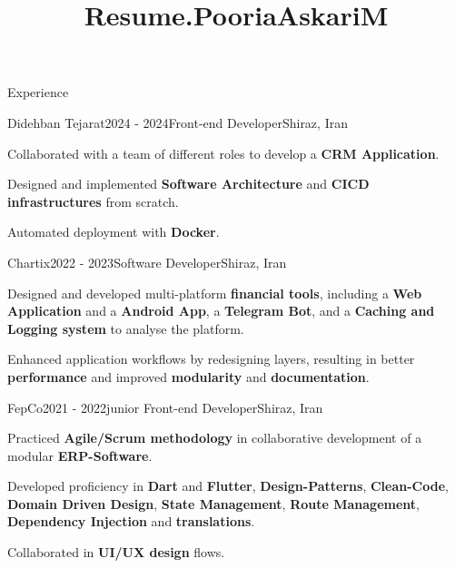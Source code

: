 \documentclass[
	a4paper, %
	11pt, %
]{resume} %
\title{Resume.PooriaAskariM}
\begin{document}
\raggedright
\setlength{\headheight}{32.33284pt}




\begin{rSection}{Experience}


	\begin{rSubsection}{Didehban Tejarat}{2024 - 2024}{Front-end Developer}{Shiraz, Iran}
		\item Collaborated with a team of different roles to develop a \textbf{CRM Application}.
		\item Designed and implemented \textbf{Software Architecture} and \textbf{CICD infrastructures} from scratch.
        \item Automated deployment with \textbf{Docker}.
        \\      
	\end{rSubsection}

	\begin{rSubsection}{Chartix}{2022 - 2023}{Software Developer}{Shiraz, Iran}
        \item Designed and developed multi-platform \textbf{financial tools}, including a \textbf{Web Application} and a \textbf{Android App}, a \textbf{Telegram Bot}, and a \textbf{Caching and Logging system} to analyse the platform. 
        \item Enhanced application workflows by redesigning layers, resulting in better \textbf{performance} and improved \textbf{modularity} and \textbf{documentation}.
        \break {}      
	\end{rSubsection}



	\begin{rSubsection}{FepCo}{2021 - 2022}{junior Front-end Developer}{Shiraz, Iran}
	   	\item Practiced \textbf{Agile/Scrum methodology} in collaborative development of a modular \textbf{ERP-Software}.
        \item Developed proficiency in \textbf{Dart} and \textbf{Flutter}, \textbf{Design-Patterns}, \textbf{Clean-Code},  \textbf{Domain Driven Design}, \textbf{State Management}, \textbf{Route Management}, \textbf{Dependency Injection} and \textbf{translations}.
		\item Collaborated in \textbf{UI/UX design} flows.
        \break {}    
	\end{rSubsection}


\end{rSection}
\end{document}
